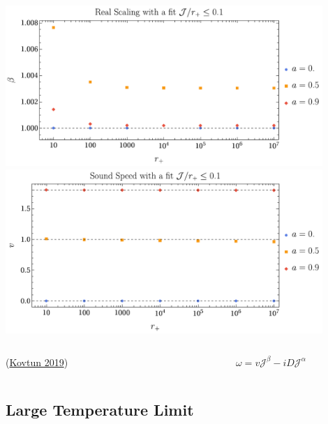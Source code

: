 \documentclass[aspectratio=169, xcolor=dvipsnames]{beamer}
\begin{document}
\begin{frame}
\begin{columns}[c]
    \begin{column}{0.5\textwidth}
      \includegraphics[width=0.9\textwidth]{figs/vector_dispersive_mode_rp_vs_re_scaling_over_a_scaled_Jleq0_1.pdf}\\
      \includegraphics[width=0.9\textwidth]{figs/vector_dispersive_mode_rp_vs_soundspeed_over_a_scaled_Jleq0_1.pdf}
    \end{column}
  \end{columns}

  \vfill

  \begin{columns}[c]
    \begin{column}{0.5\textwidth}
      (\href{https://inspirehep.net/literature/1744607}{Kovtun 2019})
    \end{column}

    \begin{column}{0.5\textwidth}
      \begin{equation*}
        \omega = v \mathcal J^\beta - i D \mathcal J^\alpha
      \end{equation*}
    \end{column}
  \end{columns}
\end{frame}

\subsection{Large Temperature Limit}
\end{document}
